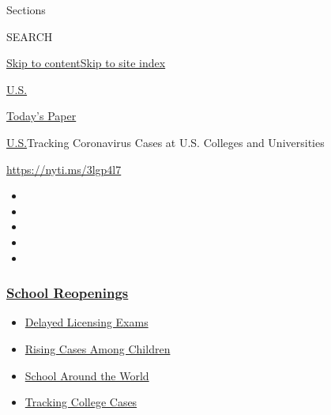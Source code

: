 Sections

SEARCH

\protect\hyperlink{site-content}{Skip to
content}\protect\hyperlink{site-index}{Skip to site index}

\href{https://www.nytimes3xbfgragh.onion/section/us}{U.S.}

\href{https://myaccount.nytimes3xbfgragh.onion/auth/login?response_type=cookie\&client_id=vi}{}

\href{https://www.nytimes3xbfgragh.onion/section/todayspaper}{Today's
Paper}

\href{/section/us}{U.S.}\textbar{}Tracking Coronavirus Cases at U.S.
Colleges and Universities

\url{https://nyti.ms/3lgp4l7}

\begin{itemize}
\item
\item
\item
\item
\item
\end{itemize}

\hypertarget{school-reopenings}{%
\subsubsection{\texorpdfstring{\href{https://www.nytimes3xbfgragh.onion/spotlight/schools-reopening?name=styln-coronavirus-schools-reopening\&region=TOP_BANNER\&block=storyline_menu_recirc\&action=click\&pgtype=Interactive\&impression_id=88b62200-efb8-11ea-8d4c-67ae230a4d58\&variant=undefined}{School
Reopenings}}{School Reopenings}}\label{school-reopenings}}

\begin{itemize}
\tightlist
\item
  \href{https://www.nytimes3xbfgragh.onion/2020/09/04/us/bar-exam-coronavirus.html?name=styln-coronavirus-schools-reopening\&region=TOP_BANNER\&block=storyline_menu_recirc\&action=click\&pgtype=Interactive\&impression_id=88b62201-efb8-11ea-8d4c-67ae230a4d58\&variant=undefined}{Delayed
  Licensing Exams}
\item
  \href{https://www.nytimes3xbfgragh.onion/interactive/2020/08/31/us/coronavirus-cases-children.html?name=styln-coronavirus-schools-reopening\&region=TOP_BANNER\&block=storyline_menu_recirc\&action=click\&pgtype=Interactive\&impression_id=88b64910-efb8-11ea-8d4c-67ae230a4d58\&variant=undefined}{Rising
  Cases Among Children}
\item
  \href{https://www.nytimes3xbfgragh.onion/2020/09/01/world/schools-reopen-globe-students.html?name=styln-coronavirus-schools-reopening\&region=TOP_BANNER\&block=storyline_menu_recirc\&action=click\&pgtype=Interactive\&impression_id=88b64911-efb8-11ea-8d4c-67ae230a4d58\&variant=undefined}{School
  Around the World}
\item
  \href{https://www.nytimes3xbfgragh.onion/interactive/2020/us/covid-college-cases-tracker.html?name=styln-coronavirus-schools-reopening\&region=TOP_BANNER\&block=storyline_menu_recirc\&action=click\&pgtype=Interactive\&impression_id=88b64912-efb8-11ea-8d4c-67ae230a4d58\&variant=undefined}{Tracking
  College Cases}
\end{itemize}

